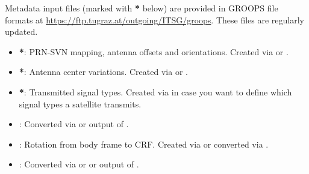 Metadata input files (marked with \textbf{*} below) are provided in GROOPS file formats at
\url{https://ftp.tugraz.at/outgoing/ITSG/groops}. These files are regularly updated.
\begin{itemize}
  \item {}\textbf{*}:
        PRN-SVN mapping, antenna offsets and orientations.
        Created via  or .
  \item {}\textbf{*}:
        Antenna center variations.
        Created via  or .
  \item {}\textbf{*}:
        Transmitted signal types.
        Created via  in case you want to define which signal
        types a satellite transmits.
  \item {}: Converted via  or
        output of .
  \item {}:
        Rotation from body frame to CRF. Created via  or converted via .
  \item {}:
        Converted via  or  or
        output of .
\end{itemize}



